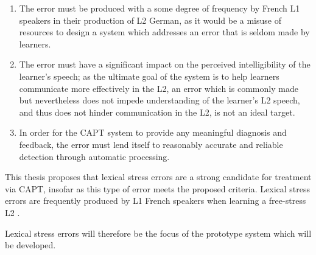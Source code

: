 \begin{enumerate}

\item The error must be produced with a some degree of frequency by French L1 speakers in their production of L2 German, as it would be a misuse of resources to design a system which addresses an error that is seldom made by learners.

\item The error must have a significant impact on the perceived intelligibility of the learner's speech; as the ultimate goal of the system is to help learners communicate more effectively in the L2, an error which is commonly made but nevertheless does not impede understanding of the learner's L2 speech, and thus does not hinder communication in the L2, is not an ideal target. 

\item In order for the CAPT system to provide any meaningful diagnosis and feedback, the error must lend itself to reasonably accurate and reliable  detection through automatic processing. 

\end{enumerate}

	
	
	This thesis proposes that lexical stress errors are a strong candidate for treatment via CAPT, insofar as this type of error meets the proposed criteria. 
Lexical stress errors are frequently produced by L1 French speakers when learning a free-stress L2 .
	
	Lexical stress errors will therefore be the focus of the prototype system which will be developed.
	 
	

